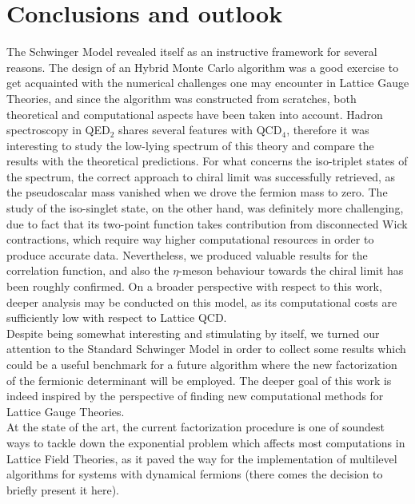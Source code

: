\chapter*{Conclusions and outlook}

The Schwinger Model revealed itself as an instructive framework for several reasons. The design of an Hybrid Monte Carlo algorithm was a good exercise to get acquainted with the numerical challenges one may encounter in Lattice Gauge Theories, and since the algorithm was constructed from scratches, both theoretical and computational aspects have been taken into account. Hadron spectroscopy in QED$_2$ shares several features with QCD$_4$, therefore it was interesting to study the low-lying spectrum of this theory and compare the results with the theoretical predictions. For what concerns the iso-triplet states of the spectrum, the correct approach to chiral limit was successfully retrieved, as the pseudoscalar mass vanished when we drove the fermion mass to zero.
The study of the iso-singlet state, on the other hand, was definitely more challenging, due to fact that its two-point function takes contribution from disconnected Wick contractions, which require way higher computational resources in order to produce accurate data. Nevertheless, we produced valuable results for the correlation function, and also the $\eta$-meson behaviour towards the chiral limit has been roughly confirmed. 
On a broader perspective with respect to this work, deeper analysis may be conducted on this model, as its computational costs are sufficiently low with respect to Lattice QCD.
\\ Despite being somewhat interesting and stimulating by itself, we turned our attention to the Standard Schwinger Model in order to collect some results which could be a useful benchmark for a future algorithm where the new factorization of the fermionic determinant will be employed. The deeper goal of this work is indeed inspired by the perspective of finding new computational methods for Lattice Gauge Theories.
\\ At the state of the art, the current factorization procedure is one of soundest ways to tackle down the exponential problem which affects most computations in Lattice Field Theories, as it paved the way for the implementation of multilevel algorithms for systems with dynamical fermions (there comes the decision to briefly present it here).
